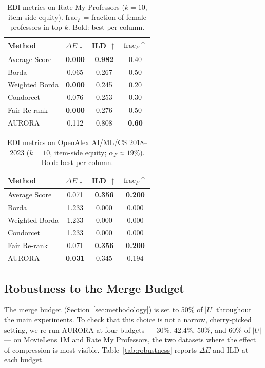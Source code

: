 \documentclass[runningheads]{llncs}
\begin{document}
\begin{table}[h!]
\caption{EDI metrics on Rate My Professors ($k=10$, item-side equity).
$\mathrm{frac}_F$ = fraction of female professors in top-$k$.
Bold: best per column.}
\label{tab:rmp}
\centering
\begin{tabular}{lccc}
\hline
Method & $\Delta E \downarrow$ & ILD $\uparrow$ &
$\mathrm{frac}_F \uparrow$ \\
\hline
Average Score  & \textbf{0.000} & \textbf{0.982} & 0.40 \\
Borda          & 0.065 & 0.267 & 0.50 \\
Weighted Borda & \textbf{0.000} & 0.245 & 0.20 \\
Condorcet      & 0.076 & 0.253 & 0.30 \\
Fair Re-rank   & \textbf{0.000} & 0.276 & 0.50 \\
AURORA           & 0.112 & 0.808 & \textbf{0.60} \\
\hline
\end{tabular}
\end{table}
\FloatBarrier
\begin{table}[h!]
\caption{EDI metrics on OpenAlex AI/ML/CS 2018--2023 ($k=10$, item-side equity;
$\alpha_F \approx 19\%$). Bold: best per column.}
\label{tab:oalex}
\centering
\begin{tabular}{lccc}
\hline
Method & $\Delta E \downarrow$ & ILD $\uparrow$ &
$\mathrm{frac}_F \uparrow$ \\
\hline
Average Score  & 0.071 & \textbf{0.356} & \textbf{0.200} \\
Borda          & 1.233 & 0.000 & 0.000 \\
Weighted Borda & 1.233 & 0.000 & 0.000 \\
Condorcet      & 1.233 & 0.000 & 0.000 \\
Fair Re-rank   & 0.071 & \textbf{0.356} & \textbf{0.200} \\
AURORA           & \textbf{0.031} & 0.345 & 0.194 \\
\hline
\end{tabular}
\end{table}
\FloatBarrier

\subsection{Robustness to the Merge Budget}
\label{sec:robustness}

The merge budget (Section~\ref{sec:methodology}) is set to 50\% of $|U|$
throughout the main experiments. To check that this choice is not a
narrow, cherry-picked setting, we re-run AURORA at four budgets --- 30\%,
42.4\%, 50\%, and 60\% of $|U|$ --- on MovieLens 1M and Rate My
Professors, the two datasets where the effect of compression is most
visible. Table~\ref{tab:robustness} reports $\Delta E$ and ILD at each
budget.
\end{document}
